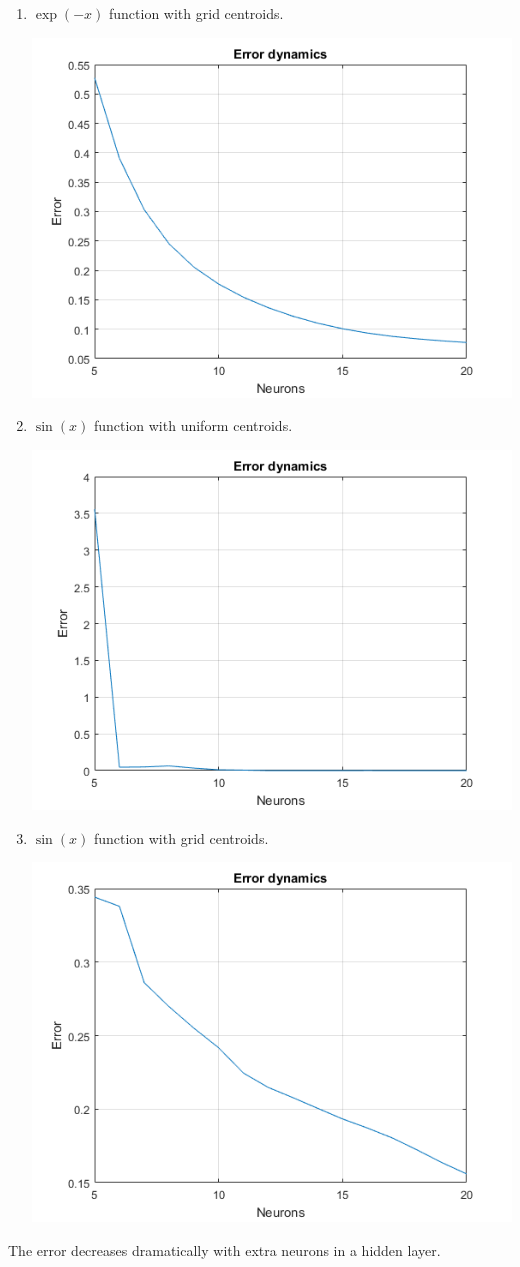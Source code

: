 \documentclass[a4paper, 12pt]{article}
\begin{document}
\begin{enumerate}
\item $\exp(-x)$ function with grid centroids.

\includegraphics[scale = 0.8]{e3.png}
\newpage
\item $\sin(x)$ function with uniform centroids.

\includegraphics[scale = 0.8]{e44.png}

\item $\sin(x)$ function with grid centroids.

\includegraphics[scale = 0.8]{e4.png}


\end{enumerate}
The error decreases dramatically with extra neurons in a hidden layer.
\end{document}
